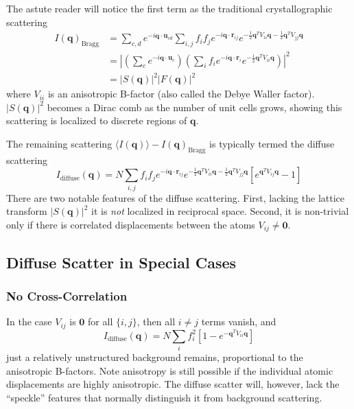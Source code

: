 \documentclass{article}
\begin{document}
The astute reader will notice the first term as the traditional crystallographic scattering
\begin{align}
I(\mathbf{q})_{\mathrm{Bragg}} &=
\sum\limits_{c, d} e^{-i \mathbf{q} \cdot \mathbf{u}_{c d}} 
\sum\limits_{i,j} f_i f_j e^{-i \mathbf{q} \cdot \mathbf{r}_{ij}} 
e^{
- \frac{1}{2} \mathbf{q}^T V_{ii} \mathbf{q}
- \frac{1}{2} \mathbf{q}^T V_{jj} \mathbf{q}
} \\
%
&= \left| \left( 
\sum_c e^{-i \mathbf{q} \cdot \mathbf{u}_{c}} 
\right) \left(
\sum\limits_{i} f_i e^{-i \mathbf{q} \cdot \mathbf{r}_{i}} 
e^{
- \frac{1}{2} \mathbf{q}^T V_{ii} \mathbf{q}
} \right) \right|^2\\
%
&= \left| S( \mathbf{q} ) \right|^2  \left| F( \mathbf{q} ) \right|^2
\end{align}
where $V_{ii}$ is an anisotropic B-factor (also called the Debye Waller factor). $\left| S( \mathbf{q} ) \right|^2$ becomes a Dirac comb as the number of unit cells grows, showing this scattering is localized to discrete regions of $\mathbf{q}$.

The remaining scattering $\langle I (\mathbf{q}) \rangle - I(\mathbf{q})_{\mathrm{Bragg}}$ is typically termed the diffuse scattering
\[
I_\mathrm{diffuse} (\mathbf{q}) = N \sum\limits_{i,j} f_i f_j e^{-i \mathbf{q} \cdot \mathbf{r}_{ij}} 
%
e^{
- \frac{1}{2} \mathbf{q}^T V_{ii} \mathbf{q}
- \frac{1}{2} \mathbf{q}^T V_{jj} \mathbf{q}
}
%
\left[ 
e^{\mathbf{q}^T V_{ij} \mathbf{q}} - 1
\right]
\]
There are two notable features of the diffuse scattering. First, lacking the lattice transform $\left| S( \mathbf{q} ) \right|^2$ it is \textit{not} localized in reciprocal space. Second, it is non-trivial only if there is correlated displacements between the atoms $V_{ij} \neq \mathbf{0}$.

\subsection{Diffuse Scatter in Special Cases}

\subsubsection{No Cross-Correlation}
In the case $V_{ij}$ is $\mathbf{0}$ for all $\{i, j\}$, then all $i \neq j$ terms vanish, and
\[
I_\mathrm{diffuse} (\mathbf{q}) = N \sum_{i} f_i^2
%
\left[ 
1 - e^{- \mathbf{q}^T V_{ii} \mathbf{q}}
\right]
\]
just a relatively unstructured background remains, proportional to the anisotropic B-factors. Note anisotropy is still possible if the individual atomic displacements are highly anisotropic. The diffuse scatter will, however, lack the ``speckle'' features that normally distinguish it from background scattering.
\end{document}
